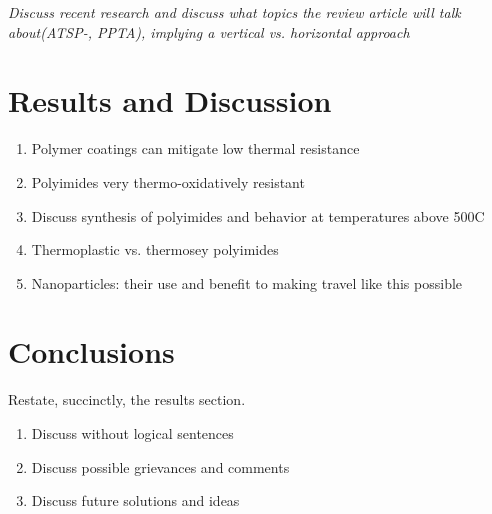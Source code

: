 \documentclass[12pt]{article}
\begin{document}
\indent \textit{Discuss recent research and discuss what topics the review article will talk about(ATSP-\cite{Bashandeh2021}, PPTA\cite{LiTong2022}), implying a vertical vs. horizontal approach}
	
\section{Results and Discussion}
	\begin{enumerate}
		\item Polymer coatings can mitigate low thermal resistance
		\item Polyimides very thermo-oxidatively resistant
		\item Discuss synthesis of polyimides and behavior at temperatures above 500\degree C
		\item Thermoplastic vs. thermosey polyimides 
		\item Nanoparticles: their use and benefit to making travel like this possible
	\end{enumerate}
	
\section{Conclusions}
	Restate, succinctly, the results section.
	\begin{enumerate}
		\item Discuss without logical sentences
		\item Discuss possible grievances and comments
		\item Discuss future solutions and ideas
	\end{enumerate}	 


 
\end{document}
